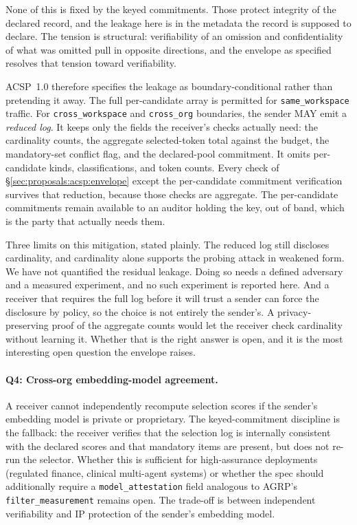 None of this is fixed by the keyed commitments. Those
protect integrity of the declared record, and the leakage
here is in the metadata the record is supposed to declare.
The tension is structural: verifiability of an omission and
confidentiality of what was omitted pull in opposite
directions, and the envelope as specified resolves that
tension toward verifiability.

ACSP~1.0 therefore specifies the leakage as
boundary-conditional rather than pretending it away. The
full per-candidate array is permitted for
\texttt{same\_workspace} traffic. For
\texttt{cross\_workspace} and \texttt{cross\_org}
boundaries, the sender MAY emit a \emph{reduced log}. It
keeps only the fields the receiver's checks actually need:
the cardinality counts, the aggregate
selected-token total against the budget, the mandatory-set
conflict flag, and the declared-pool commitment. It omits
per-candidate kinds, classifications, and token counts.
Every check of \S\ref{sec:proposals:acsp:envelope} except
the per-candidate commitment verification survives that
reduction, because those checks are aggregate. The
per-candidate commitments remain available to an auditor
holding the key, out of band, which is the party that
actually needs them.

Three limits on this mitigation, stated plainly. The reduced
log still discloses cardinality, and cardinality alone
supports the probing attack in weakened form. We have not
quantified the residual leakage. Doing so needs a defined
adversary and a measured experiment, and no such experiment
is reported here. And a receiver that requires the full log
before it will trust a sender can force the disclosure by
policy, so the choice is not entirely the sender's. A
privacy-preserving proof of the aggregate counts would let
the receiver check cardinality without learning it. Whether
that is the right answer is open, and it is the most
interesting open question the envelope raises.

\paragraph{Q4: Cross-org embedding-model agreement.}
A receiver cannot independently recompute selection
scores if the sender's embedding model is private or
proprietary. The keyed-commitment discipline is the fallback:
the receiver verifies that the selection log is
internally consistent with the declared scores and that
mandatory items are present, but does not re-run the
selector. Whether this is sufficient for high-assurance
deployments (regulated finance, clinical multi-agent
systems) or whether the spec should additionally require
a \texttt{model\_attestation} field analogous to AGRP's
\texttt{filter\_measurement} remains open. The trade-off
is between independent verifiability and IP protection
of the sender's embedding model.


